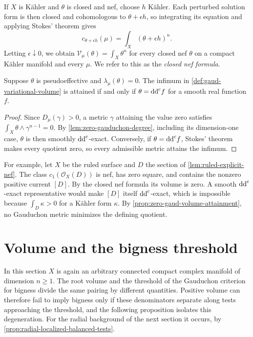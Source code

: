 If $X$ is K\"ahler and $\theta$ is closed and nef, choose $h$ K\"ahler. Each perturbed solution form is then closed and cohomologous to $\theta+\epsilon h$, so integrating its equation and applying Stokes' theorem gives
\[
 c_{\theta+\epsilon h}(\mu)=\int_X(\theta+\epsilon h)^n.
\]
Letting $\epsilon\downarrow0$, we obtain $\mathcal V_\mu(\theta)=\int_X\theta^n$ for every closed nef $\theta$ on a compact K\"ahler manifold and every $\mu$. We refer to this as the \emph{closed nef formula}.

\begin{proposition}\label{prop:zero-gaud-volume-attainment}
Suppose $\theta$ is pseudoeffective and $\lambda_\mu(\theta)=0$. The infimum in \cref{def:gaud-variational-volume} is attained if and only if $\theta=\mathrm{dd}^{\mathrm{c}} f$ for a smooth real function $f$.
\end{proposition}
\begin{proof}
Since $D_\mu(\gamma)>0$, a metric $\gamma$ attaining the value zero satisfies $\int_X\theta\wedge\gamma^{n-1}=0$. By \cref{lem:zero-gauduchon-degree}, including its dimension-one case, $\theta$ is then smoothly $\mathrm{dd}^{\mathrm{c}}$-exact. Conversely, if $\theta=\mathrm{dd}^{\mathrm{c}} f$, Stokes' theorem makes every quotient zero, so every admissible metric attains the infimum.
\end{proof}

For example, let $X$ be the ruled surface and $D$ the section of \cref{lem:ruled-explicit-nef}. The class $c_1(\mathcal O_X(D))$ is nef, has zero square, and contains the nonzero positive current $[D]$. By the closed nef formula its volume is zero. A smooth $\mathrm{dd}^{\mathrm{c}}$-exact representative would make $[D]$ itself $\mathrm{dd}^{\mathrm{c}}$-exact, which is impossible because $\int_D\kappa>0$ for a K\"ahler form $\kappa$. By \cref{prop:zero-gaud-volume-attainment}, no Gauduchon metric minimizes the defining quotient.





\section{Volume and the bigness threshold}
\label{sec:gaud-volume-bigness-threshold}

In this section $X$ is again an arbitrary connected compact complex manifold of dimension $n\geq1$. The root volume and the threshold of the Gauduchon criterion for bigness divide the same pairing by different quantities. Positive volume can therefore fail to imply bigness only if these denominators separate along tests approaching the threshold, and the following proposition isolates this degeneration. For the radial background of the next section it occurs, by \cref{prop:radial-localized-balanced-tests}.

